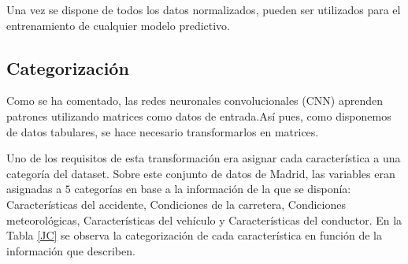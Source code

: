 \documentclass{uathesis-es}
\begin{document}
{Una vez se dispone de todos los datos normalizados, pueden ser utilizados para el entrenamiento de cualquier modelo predictivo.


\subsection*{Categorización}

Como se ha comentado, las redes neuronales convolucionales (CNN) aprenden patrones utilizando matrices como datos de entrada.Así pues, como disponemos de datos tabulares, se hace necesario transformarlos en matrices.

Uno de los requisitos de esta transformación era asignar cada característica a una categoría del dataset. Sobre este conjunto de datos de Madrid, las variables eran asignadas a $5$ categorías en base a la información de la que se disponía: Características del accidente, Condiciones de la carretera, Condiciones meteorológicas, Características del vehículo y Características del conductor. En la Tabla \ref{JC} se observa la categorización de cada característica en función de la información que describen.





\begin{table}[H]
	\centering


\end{table}}
\end{document}
